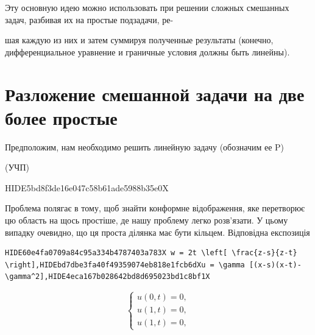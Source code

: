 \documentclass[
  ukrainian,
]{article}
\begin{document}
Эту основную идею можно использовать при решении сложных смешанных
задач, разбивая их на простые подзадачи, ре-

шая каждую из них и затем суммируя полученные результаты (конечно,
дифференциальное уравнение и граничные условия должны быть линейны).

\section{Разложение смешанной задачи на две более
простые}\label{ux440ux430ux437ux43bux43eux436ux435ux43dux438ux435-ux441ux43cux435ux448ux430ux43dux43dux43eux439-ux437ux430ux434ux430ux447ux438-ux43dux430-ux434ux432ux435-ux431ux43eux43bux435ux435-ux43fux440ux43eux441ux442ux44bux435}

Предположим, нам необходимо решить линейную задачу (обозначим ее P)

(УЧП)

HIDE5bd8f3de16e047c58b61ade5988b35e0X

Проблема полягає в тому, щоб знайти конформне відображення, яке
перетворює цю область на щось простіше, де нашу проблему легко
розв'язати. У цьому випадку очевидно, що ця проста ділянка має бути
кільцем. Відповідна експозиція

\begin{verbatim}
HIDE60e4fa0709a84c95a334b4787403a783X w = 2t \left[ \frac{z-s}{z-t} \right],HIDEbd7dbe3fa40f49359074eb818e1fcb6dXu = \gamma [(x-s)(x-t)-\gamma^2],HIDE4eca167b028642bd8d695023bd1c8bf1X
\end{verbatim}

\[
\begin{cases} u(0, t) = 0, \\ u(1, t) = 0, \\ u(1, t) = 0, \end{cases}
\]
\end{document}
